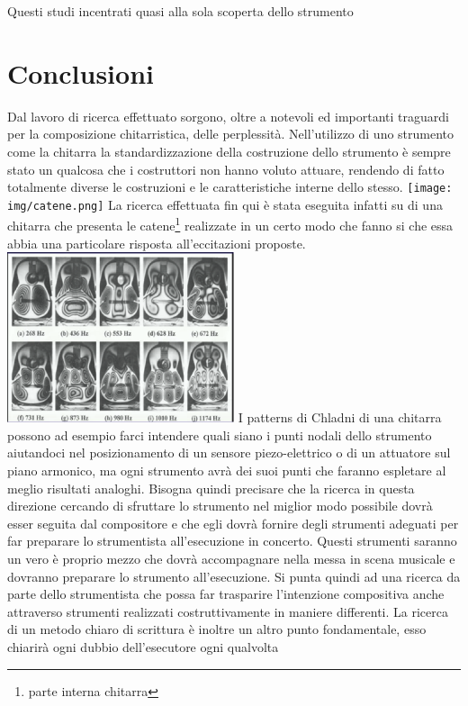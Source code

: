 \documentclass[oneside]{article}
\begin{document}
\begin{multicols*}{2}
Questi studi incentrati quasi alla sola scoperta dello strumento

\section{ Conclusioni}

Dal lavoro di ricerca effettuato sorgono, oltre a notevoli ed importanti traguardi per la composizione chitarristica, delle perplessità. Nell’utilizzo di uno strumento come la chitarra la standardizzazione della costruzione dello strumento è sempre stato un qualcosa che i costruttori non hanno voluto attuare, rendendo di fatto totalmente diverse le costruzioni e le caratteristiche interne dello stesso.
\texttt{[image: img/catene.png]}
La ricerca effettuata fin qui è stata eseguita infatti su di una chitarra che presenta le catene\footnote{parte interna chitarra} realizzate in un certo modo che fanno si che essa abbia una particolare risposta all’eccitazioni proposte.
\includegraphics[width=0.5\textwidth]{img/chladni1.png}
I patterns di Chladni  di una chitarra possono ad esempio farci intendere quali siano i punti nodali dello strumento aiutandoci nel posizionamento di un sensore piezo-elettrico o di un attuatore sul piano armonico, ma ogni strumento avrà dei suoi punti che faranno espletare al meglio risultati analoghi. Bisogna quindi precisare che la ricerca in questa direzione cercando di sfruttare lo strumento nel miglior modo possibile dovrà esser seguita dal compositore e che egli dovrà fornire degli strumenti adeguati per far preparare lo strumentista all'esecuzione in concerto. Questi strumenti saranno un vero è proprio mezzo che dovrà accompagnare nella messa in scena musicale e dovranno preparare lo strumento all'esecuzione. Si punta quindi ad una ricerca da parte dello strumentista che possa far trasparire l'intenzione compositiva anche attraverso strumenti realizzati costruttivamente in maniere differenti.
La ricerca di un metodo chiaro di scrittura è inoltre un altro punto fondamentale, esso chiarirà ogni dubbio dell'esecutore ogni qualvolta 


\end{multicols*}
\end{document}
